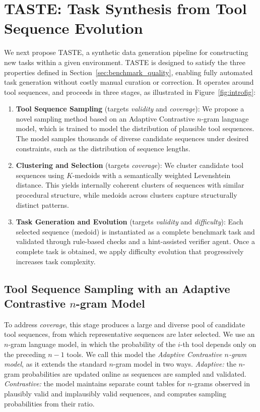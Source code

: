 \section{TASTE: Task Synthesis from Tool Sequence Evolution}
\label{sec:method}

We next propose TASTE, a synthetic data generation pipeline for constructing new tasks within a given environment. TASTE is designed to satisfy the three properties defined in Section~\ref{sec:benchmark_quality}, enabling fully automated task generation without costly manual curation or correction. It operates around tool sequences, and proceeds in three stages, as illustrated in Figure~\ref{fig:introfig}:

\begin{enumerate}
\item \textbf{Tool Sequence Sampling} (targets \emph{validity} and \emph{coverage}): 
We propose a novel sampling method based on an Adaptive Contrastive $n$-gram language model, which is trained to model the distribution of plausible tool sequences. The model samples thousands of diverse candidate sequences under desired constraints, such as the distribution of sequence lengths.

\item \textbf{Clustering and Selection} (targets \emph{coverage}):
We cluster candidate tool sequences using $K$-medoids with a semantically weighted Levenshtein distance. This yields internally coherent clusters of sequences with similar procedural structure, while medoids across clusters capture structurally distinct patterns.

\item \textbf{Task Generation and Evolution} (targets \emph{validity} and \emph{difficulty}): 
Each selected sequence (medoid) is instantiated as a complete benchmark task and validated through rule-based checks and a hint-assisted verifier agent. Once a complete task is obtained, we apply difficulty evolution that progressively increases task complexity.
\end{enumerate}

\subsection{Tool Sequence Sampling with an Adaptive Contrastive $n$-gram Model}
\label{sub:n_gram}

To address \emph{coverage}, this stage produces a large and diverse pool of candidate tool sequences, from which representative sequences are later selected. We use an $n$-gram language model, in which the probability of the $i$-th tool depends only on the preceding $n{-}1$ tools. We call this model the \emph{Adaptive Contrastive $n$-gram model}, as it extends the standard $n$-gram model in two ways. \textit{Adaptive:} the $n$-gram probabilities are updated online as sequences are sampled and validated. \textit{Contrastive:} the model maintains separate count tables for $n$-grams observed in plausibly valid and implausibly valid sequences, and computes sampling probabilities from their ratio.

